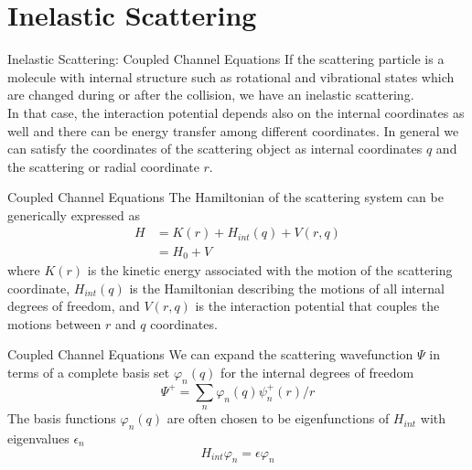 \documentclass{beamer}
\begin{document}
	\section{Inelastic Scattering}
	\begin{frame}{Inelastic Scattering: Coupled Channel Equations}
		If the scattering particle is a molecule with internal structure such as rotational and vibrational states which are changed during or after the collision, we have an inelastic scattering. \\
		In that case, the interaction potential depends also on the internal coordinates as well and there can be energy transfer among different coordinates. In general we can satisfy the coordinates of the scattering object as internal coordinates $q$ and the scattering or radial coordinate $r$.
	\end{frame}
	\begin{frame}{Coupled Channel Equations}
		The Hamiltonian of the scattering system can be generically expressed as 
		\begin{align}
			H&=K(r)+H_{int}(q)+V(r,q)\nonumber\\
			&=H_0+V
		\end{align}
		where $K(r)$ is the kinetic energy associated with the motion of the scattering coordinate, $H_{int}(q)$ is the Hamiltonian describing the motions of all internal degrees of freedom, and $V(r,q)$ is the interaction potential that couples the motions between $r$ and $q$ coordinates.
	\end{frame}
	\begin{frame}{Coupled Channel Equations}
		We can expand the scattering wavefunction $\Psi$ in terms of a complete basis set $\varphi_n(q)$ for the internal degrees of freedom
		\begin{equation}
			\Psi^+=\sum\limits_n\varphi_n(q)\psi_n^+(r)/r
		\end{equation}
		The basis functions $\varphi_n(q)$ are often chosen to be eigenfunctions of $H_{int}$ with eigenvalues $\epsilon_n$
		\begin{equation}
			H_{int}\varphi_n=\epsilon\varphi_n
		\end{equation}
	\end{frame}
\end{document}
